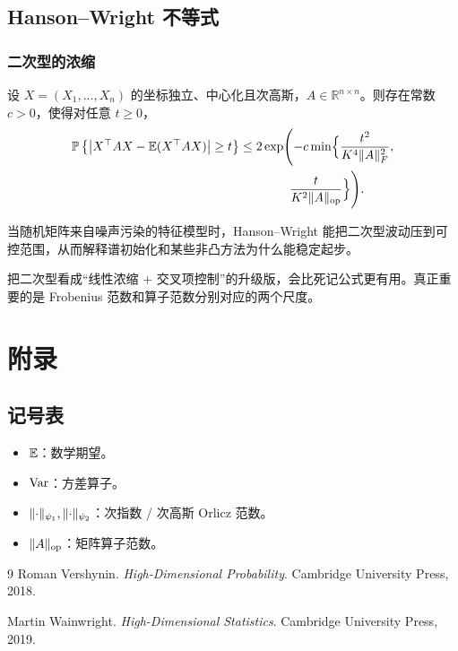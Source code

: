 \documentclass[10pt,openany]{book}
\begin{document}
\chapter{Hanson--Wright 不等式}
\section{二次型的浓缩}

\begin{theorem}
设 $X=(X_1,\dots,X_n)$ 的坐标独立、中心化且次高斯，$A\in\mathbb{R}^{n\times n}$。则存在常数 $c>0$，使得对任意 $t\ge 0$，
\[
\begin{aligned}
\mathbb{P}\left\{
  \abs*{X^\top A X - \E(X^\top A X)} \ge t
\right\}
&\le 2\exp\Biggl(
-c \min\Bigl\{
\frac{t^2}{K^4 \norm{A}_F^2}, \\
&\qquad\qquad
\frac{t}{K^2 \norm{A}_{\mathrm{op}}}
\Bigr\}
\Biggr).
\end{aligned}
\]
\end{theorem}

\begin{corollary}[谱初始化中的应用]
当随机矩阵来自噪声污染的特征模型时，Hanson--Wright 能把二次型波动压到可控范围，从而解释谱初始化和某些非凸方法为什么能稳定起步。
\end{corollary}

\begin{Takeaway}
把二次型看成“线性浓缩 + 交叉项控制”的升级版，会比死记公式更有用。真正重要的是 Frobenius 范数和算子范数分别对应的两个尺度。
\end{Takeaway}

\appendix
\part{附录}

\chapter{记号表}
\begin{itemize}
  \item $\E$：数学期望。
  \item $\Var$：方差算子。
  \item $\norm{\cdot}_{\psi_1}, \norm{\cdot}_{\psi_2}$：次指数 / 次高斯 Orlicz 范数。
  \item $\norm{A}_{\mathrm{op}}$：矩阵算子范数。
\end{itemize}

\backmatter
\begin{thebibliography}{9}
Roman Vershynin. \emph{High-Dimensional Probability}. Cambridge University Press, 2018.

Martin Wainwright. \emph{High-Dimensional Statistics}. Cambridge University Press, 2019.
\end{thebibliography}
\end{document}

